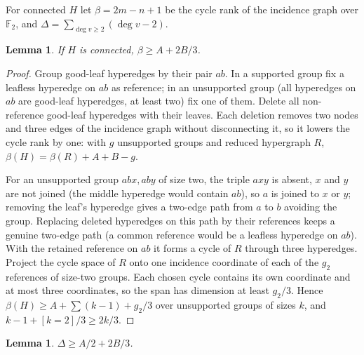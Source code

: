 \documentclass[11pt]{article}
\newtheorem{lemma}[theorem]{Lemma}
\theoremstyle{remark}
\begin{document}
For connected $H$ let $\beta=2m-n+1$ be the cycle rank of the incidence
graph over $\mathbb F_2$, and $\Delta=\sum_{\deg v\ge2}(\deg v-2)$.

\begin{lemma}\label{lem:cycle}
If $H$ is connected, $\beta\ge A+2B/3$.
\end{lemma}

\begin{proof}
Group good-leaf hyperedges by their pair $ab$. In a supported group fix a
leafless hyperedge on $ab$ as reference; in an unsupported group (all
hyperedges on $ab$ are good-leaf hyperedges, at least two) fix one of them.
Delete all non-reference good-leaf hyperedges with their leaves. Each
deletion removes two nodes and three edges of the incidence graph without
disconnecting it, so it lowers the cycle rank by one: with $g$ unsupported
groups and reduced hypergraph $R$, $\beta(H)=\beta(R)+A+B-g$.

For an unsupported group $abx,aby$ of size two, the triple $axy$ is
absent, $x$ and $y$ are not joined (the middle hyperedge would contain
$ab$), so $a$ is joined to $x$ or $y$; removing the leaf's hyperedge gives
a two-edge path from $a$ to $b$ avoiding the group. Replacing deleted
hyperedges on this path by their references keeps a genuine two-edge path
(a common reference would be a leafless hyperedge on $ab$). With the
retained reference on $ab$ it forms a cycle of $R$ through three
hyperedges. Project the cycle space of $R$ onto one incidence coordinate
of each of the $g_2$ references of size-two groups. Each chosen cycle
contains its own coordinate and at most three coordinates, so the span has
dimension at least $g_2/3$. Hence $\beta(H)\ge A+\sum(k-1)+g_2/3$ over
unsupported groups of sizes $k$, and $k-1+[k=2]/3\ge2k/3$.
\end{proof}

\begin{lemma}\label{lem:degree}
$\Delta\ge A/2+2B/3$.
\end{lemma}
\end{document}
